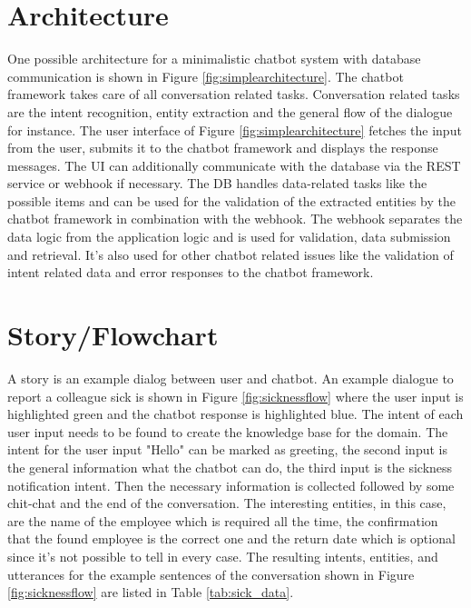 \section{Architecture}

One possible architecture for a minimalistic chatbot system with database communication is shown in Figure \ref{fig:simplearchitecture}.
The chatbot framework takes care of all conversation related tasks. 
Conversation related tasks are the intent recognition, entity extraction and the general flow of the dialogue for instance. 
The user interface of Figure \ref{fig:simplearchitecture} fetches the input from the user, submits it to the chatbot framework 
and displays the response messages. 
The UI can additionally communicate with the database via the REST service or webhook if necessary.
The DB handles data-related tasks like the possible items and can be used for the validation of the extracted entities
 by the chatbot framework in combination with the webhook. 
 The webhook separates the data logic from the application logic and is used for validation, 
 data submission and retrieval.
 It's also used for other chatbot related issues like the validation of intent related data and error responses to the chatbot framework.

 \section{Story/Flowchart}
 
 
 A story is an example dialog between user and chatbot. An example dialogue to report a colleague sick is shown in Figure \ref{fig:sicknessflow} 
 where the user input is highlighted green and the chatbot response is highlighted blue.
 The intent of each user input needs to be found to create the knowledge base for the domain. 
 The intent for the user input "Hello" can be marked as greeting, the second input is the general information what the chatbot can do, 
 the third input is the sickness notification intent. Then the necessary information is collected followed by some chit-chat and the end of the conversation. 
 The interesting entities, in this case, are the name of the employee which is required all the time, the confirmation that the found employee is the 
 correct one and the return date which is optional since it's not possible to tell in every case. 
 The resulting intents, entities, and utterances for the example sentences of the conversation 
 shown in Figure \ref{fig:sicknessflow} are listed in Table \ref{tab:sick_data}.
 
